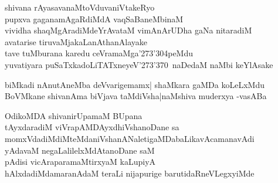 \begin{entry}
\end{entry}

\begin{entry}
\gl{}
\end{entry}

\begin{entry}
\gl{}
\begin{shl}
shivana rAyasavanaMtoVduvaniVtakeRyo\\
pupxva gaganamAgaRdiMdA vaqSaBaneMbinaM\\
vividha shaqMgAradiMdeYrAvataM vimAnArUDha gaNa nitaradiM\\
avatarise tiruvaMjakaLanAthanAlayake\\
tave tuMburana karedu ceVramaMga\char'273\char'304peMdu\\
yuvatiyara puSaTxkadoLiTATxneyeV\char'273\char'370\ naDedaM naMbi keYlAsake
\end{shl}
\end{entry}

\begin{entry}
\end{entry}

\begin{entry}
\gl{}
\begin{shl}
biMkadi nAnutAneMba deVvarigemamx| shaMkara gaMDa koLeLxMdu\\
BoVMkane shivanAma biVjava taMdiVsha|naMshiva muderxya -vasABa
\end{shl}
\end{entry}

\begin{entry}
\gl{}
\begin{shl}
OdikoMDA shivanirUpamaM BUpana\\
tAyxdaradiM viVrapAMDAyxdhiVshanoDane sa\\
momxVdadiMdiMteMdaniVshanANaletigaMDabaLikavAcamanavAdi\\
yAdavaM negaLalilelxMdAtanoDane saM\\
pAdisi vicAraparamaMtirxyaM kaLupiyA\\
hAlxdadiMdamaranAdaM teraLi nijapurige barutidaRneVLegxyiMde
\end{shl}
\end{entry}

